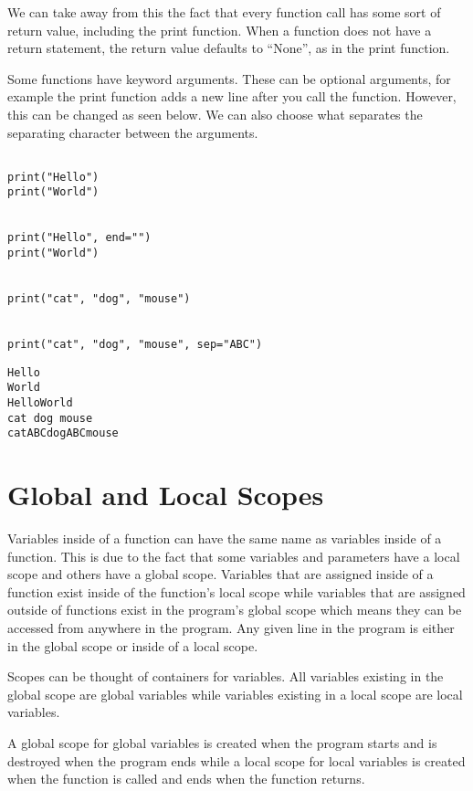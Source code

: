 \documentclass[11pt]{article}
\begin{document}
We can take away from this the fact that every function call has some sort of return value, including the print function. When a function does not have a return statement, the return value defaults to ``None'', as in the print function.


Some functions have keyword arguments. These can be optional arguments, for example the print function adds a new line after you call the function. However, this can be changed as seen below. We can also choose what separates the separating character between the arguments.


\begin{verbatim}

print("Hello")
print("World")


print("Hello", end="")
print("World")


print("cat", "dog", "mouse")


print("cat", "dog", "mouse", sep="ABC")

\end{verbatim}

\begin{verbatim}
Hello
World
HelloWorld
cat dog mouse
catABCdogABCmouse
\end{verbatim}

\section{Global and Local Scopes}
\label{sec:org96d6251}

Variables inside of a function can have the same name as variables inside of a function. This is due to the fact that some variables and parameters have a local scope and others have a global scope. Variables that are assigned inside of a function exist inside of the function's local scope while variables that are assigned outside of functions exist in the program's global scope which means they can be accessed from anywhere in the program. Any given line in the program is either in the global scope or inside of a local scope.

Scopes can be thought of containers for variables. All variables existing in the global scope are global variables while variables existing in a local scope are local variables.

A global scope for global variables is created when the program starts and is destroyed when the program ends while a local scope for local variables is created when the function is called and ends when the function returns.
\end{document}
